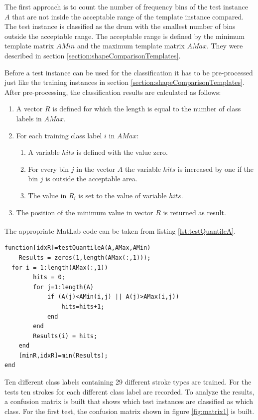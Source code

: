 The first approach is to count the number of frequency bins of the test instance $A$ that are not inside the acceptable range of the template instance compared. The test instance is classified as the drum with the smallest number of bins outside the acceptable range. The acceptable range is defined by the minimum template matrix $AMin$ and the maximum template matrix $AMax$. They were described in section \ref{section:shapeComparisonTemplates}. 

Before a test instance can be used for the classification it has to be pre-processed just like the training instances in section \ref{section:shapeComparisonTemplates}. After pre-processing, the classification results are calculated as follows:

\begin{enumerate}
	\item A vector $R$ is defined for which the length is equal to the number of class labels in $AMax$.
	\item For each training class label $i$ in $AMax$:
		\begin{enumerate}
			\item A variable $hits$ is defined with the value zero.
			\item For every bin $j$ in the vector $A$ the variable $hits$ is increased by one if the bin $j$ is outside the acceptable area.
			\item The value in $R_i$ is set to the value of variable $hits$.
		\end{enumerate}
	\item The position of the minimum value in vector $R$ is returned as result.
\end{enumerate}

The appropriate MatLab\textsuperscript{\textregistered} code can be taken from listing \ref{lst:testQuantileA}.

\begin{lstlisting}[caption={testQuantileA},label={lst:testQuantileA}]
function[idxR]=testQuantileA(A,AMax,AMin)
	Results = zeros(1,length(AMax(:,1)));    
  for i = 1:length(AMax(:,1))
		hits = 0;  
		for j=1:length(A)
			if (A(j)<AMin(i,j) || A(j)>AMax(i,j))  
				hits=hits+1;
			end
		end
		Results(i) = hits; 
	end
	[minR,idxR]=min(Results);
end
\end{lstlisting}

Ten different class labels containing 29 different stroke types are trained. For the tests ten strokes for each different class label are recorded. To analyze the results, a confusion matrix is built that shows which test instances are classified as which class. For the first test, the confusion matrix shown in figure \ref{fig:matrix1} is built.

